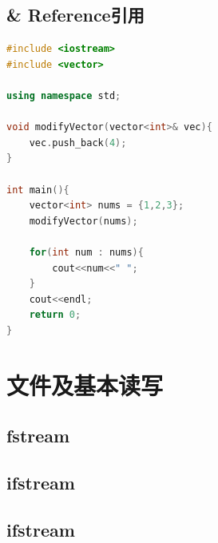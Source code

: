\documentclass[12pt,twiside,a4paper]{ctexbook}
\numberwithin{chapter}{part}
\begin{document}
\section{\& Reference引用}
\begin{lstlisting}[language=C++]
#include <iostream>
#include <vector>

using namespace std;

void modifyVector(vector<int>& vec){
	vec.push_back(4);
}

int main(){
	vector<int> nums = {1,2,3};
	modifyVector(nums);

	for(int num : nums){
		cout<<num<<" ";
	}
	cout<<endl;
	return 0;
}
\end{lstlisting}


\chapter{文件及基本读写}
\section{fstream}
\section{ifstream}
\section{ifstream}
\end{document}
